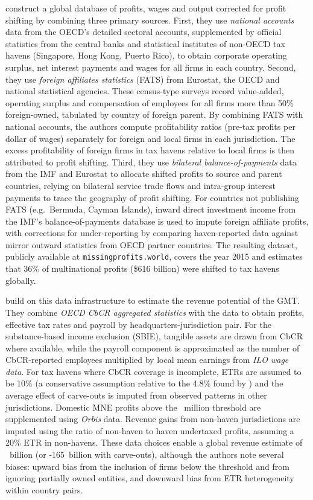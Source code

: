 \documentclass[11pt,a4paper]{article}
\newcommand{\EUR}{\texteuro}
\begin{document}
\citet{torslov2022} construct a global database of profits, wages and output corrected for profit shifting by combining three primary sources. First, they use \textit{national accounts} data from the OECD's detailed sectoral accounts, supplemented by official statistics from the central banks and statistical institutes of non-OECD tax havens (Singapore, Hong Kong, Puerto Rico), to obtain corporate operating surplus, net interest payments and wages for all firms in each country. Second, they use \textit{foreign affiliates statistics} (FATS) from Eurostat, the OECD and national statistical agencies. These census-type surveys record value-added, operating surplus and compensation of employees for all firms more than 50\% foreign-owned, tabulated by country of foreign parent. By combining FATS with national accounts, the authors compute profitability ratios (pre-tax profits per dollar of wages) separately for foreign and local firms in each jurisdiction. The excess profitability of foreign firms in tax havens relative to local firms is then attributed to profit shifting. Third, they use \textit{bilateral balance-of-payments} data from the IMF and Eurostat to allocate shifted profits to source and parent countries, relying on bilateral service trade flows and intra-group interest payments to trace the geography of profit shifting. For countries not publishing FATS (e.g.\ Bermuda, Cayman Islands), inward direct investment income from the IMF's balance-of-payments database is used to impute foreign affiliate profits, with corrections for under-reporting by comparing haven-reported data against mirror outward statistics from OECD partner countries. The resulting dataset, publicly available at \texttt{missingprofits.world}, covers the year 2015 and estimates that 36\% of multinational profits (\$616 billion) were shifted to tax havens globally.

\citet{barake2022} build on this data infrastructure to estimate the revenue potential of the GMT. They combine \textit{OECD CbCR aggregated statistics} with the \citet{torslov2022} data to obtain profits, effective tax rates and payroll by headquarters-jurisdiction pair. For the substance-based income exclusion (SBIE), tangible assets are drawn from CbCR where available, while the payroll component is approximated as the number of CbCR-reported employees multiplied by local mean earnings from \textit{ILO wage data}. For tax havens where CbCR coverage is incomplete, ETRs are assumed to be 10\% (a conservative assumption relative to the 4.8\% found by \citeauthor{torslov2022}) and the average effect of carve-outs is imputed from observed patterns in other jurisdictions. Domestic MNE profits above the \EUR 750~million threshold are supplemented using \textit{Orbis} data. Revenue gains from non-haven jurisdictions are imputed using the ratio of non-haven to haven undertaxed profits, assuming a 20\% ETR in non-havens. These data choices enable a global revenue estimate of \EUR 179~billion (or \EUR 139-165~billion with carve-outs), although the authors note several biases: upward bias from the inclusion of firms below the threshold and from ignoring partially owned entities, and downward bias from ETR heterogeneity within country pairs.
\end{document}
